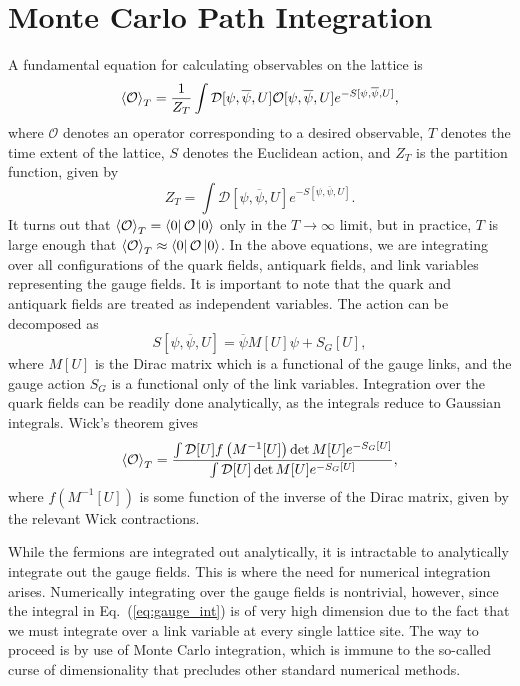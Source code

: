 \section{Monte Carlo Path Integration}
A fundamental equation for calculating observables on the lattice is
\begin{equation}
    \expval{\mathcal O}_T = \frac{1}{Z_T} \int \mathcal D[\psi, \overline \psi, U] \mathcal O[\psi, \overline \psi, U] e^{-S[\psi, \overline \psi, U]},
\end{equation}
where $\mathcal O$ denotes an operator corresponding to a desired observable, $T$ denotes the time extent of the lattice, $S$ denotes the Euclidean action, and $Z_T$ is the partition function, given by
\begin{equation}
    Z_T = \int \mathcal D[\psi, \overline \psi, U] e^{-S[\psi, \overline \psi, U]}.
\end{equation}
It turns out that $\expval{\mathcal O}_T = \bra 0 \mathcal O \ket 0$ only in the $T\rightarrow\infty$ limit, but in practice, $T$ is large enough that $\expval{\mathcal O}_T \approx \bra 0 \mathcal O \ket 0$. In the above equations, we are integrating over all configurations of the quark fields, antiquark fields, and link variables representing the gauge fields. It is important to note that the quark and antiquark fields are treated as independent variables. The action can be decomposed as
\begin{equation}
    S[\psi, \overline \psi, U] = \overline \psi M[U] \psi + S_G[U],
\end{equation}
where $M[U]$ is the Dirac matrix which is a functional of the gauge links, and the gauge action $S_G$ is a functional only of the link variables. Integration over the quark fields can be readily done analytically, as the integrals reduce to Gaussian integrals. Wick's theorem gives
\begin{equation}\label{eq:gauge_int}
    \expval{\mathcal O}_T = \frac{\int \mathcal{D}[U] f\left(M^{-1}[U]\right) \det M[U] e^{-S_{G}[U]}}{\int \mathcal{D}[U] \det M[U] e^{-S_{G}[U]}},
\end{equation}
where $f\left(M^{-1}[U]\right)$ is some function of the inverse of the Dirac matrix, given by the relevant Wick contractions.

While the fermions are integrated out analytically, it is intractable to analytically integrate out the gauge fields. This is where the need for numerical integration arises. Numerically integrating over the gauge fields is nontrivial, however, since the integral in Eq.~(\ref{eq:gauge_int}) is of very high dimension due to the fact that we must integrate over a link variable at every single lattice site. The way to proceed is by use of Monte Carlo integration, which is immune to the so-called curse of dimensionality that precludes other standard numerical methods.

